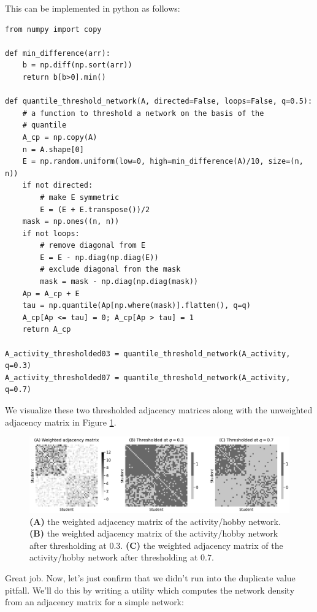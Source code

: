This can be implemented in python as follows:

\begin{lstlisting}[style=python]
from numpy import copy

def min_difference(arr):
    b = np.diff(np.sort(arr))
    return b[b>0].min()

def quantile_threshold_network(A, directed=False, loops=False, q=0.5):
    # a function to threshold a network on the basis of the
    # quantile
    A_cp = np.copy(A)
    n = A.shape[0]
    E = np.random.uniform(low=0, high=min_difference(A)/10, size=(n, n))
    if not directed:
        # make E symmetric
        E = (E + E.transpose())/2
    mask = np.ones((n, n))
    if not loops:
        # remove diagonal from E
        E = E - np.diag(np.diag(E))
        # exclude diagonal from the mask
        mask = mask - np.diag(np.diag(mask))
    Ap = A_cp + E
    tau = np.quantile(Ap[np.where(mask)].flatten(), q=q)
    A_cp[Ap <= tau] = 0; A_cp[Ap > tau] = 1
    return A_cp

A_activity_thresholded03 = quantile_threshold_network(A_activity, q=0.3)
A_activity_thresholded07 = quantile_threshold_network(A_activity, q=0.7)
\end{lstlisting}
We visualize these two thresholded adjacency matrices along with the unweighted adjacency matrix in Figure \ref{fig:ch4:threshold_res}.

\begin{figure}[h]
    \centering
    \includegraphics[width=\linewidth]{representations/ch4/Images/threshold_res.png}
    \caption[Thresholding]{\textbf{(A)} the weighted adjacency matrix of the activity/hobby network. \textbf{(B)} the weighted adjacency matrix of the activity/hobby network after thresholding at $0.3$. \textbf{(C)} the weighted adjacency matrix of the activity/hobby network after thresholding at $0.7$.}
    \label{fig:ch4:threshold_res}
\end{figure}

Great job. Now, let's just confirm that we didn't run into the duplicate value pitfall. We'll do this by writing a utility which computes the network density from an adjacency matrix for a simple network:

